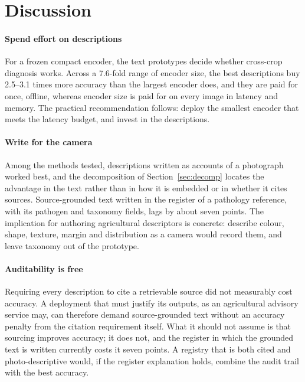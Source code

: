 \documentclass[a4paper,fleqn]{cas-dc}
\begin{document}
\section{Discussion}
\label{sec:discussion}

\paragraph{Spend effort on descriptions} For a frozen compact encoder, the text prototypes decide
whether cross-crop diagnosis works. Across a 7.6-fold range of encoder size, the best descriptions
buy 2.5--3.1 times more accuracy than the largest encoder does, and they are paid for once, offline,
whereas encoder size is paid for on every image in latency and memory. The practical recommendation
follows: deploy the smallest encoder that meets the latency budget, and invest in the descriptions.

\paragraph{Write for the camera} Among the methods tested, descriptions written as accounts of a
photograph worked best, and the decomposition of Section~\ref{sec:decomp} locates the advantage in
the text rather than in how it is embedded or in whether it cites sources. Source-grounded text
written in the register of a pathology reference, with its pathogen and taxonomy fields, lags by about
seven points. The implication for authoring agricultural descriptors is concrete: describe colour,
shape, texture, margin and distribution as a camera would record them, and leave taxonomy out of the
prototype.

\paragraph{Auditability is free} Requiring every description to cite a retrievable source did not
measurably cost accuracy. A deployment that must justify its outputs, as an agricultural advisory
service may, can therefore demand source-grounded text without an accuracy penalty from the citation
requirement itself. What it should not assume is that sourcing improves accuracy; it does not, and the
register in which the grounded text is written currently costs it seven points. A registry that is both
cited and photo-descriptive would, if the register explanation holds, combine the audit trail with the
best accuracy.
\end{document}
